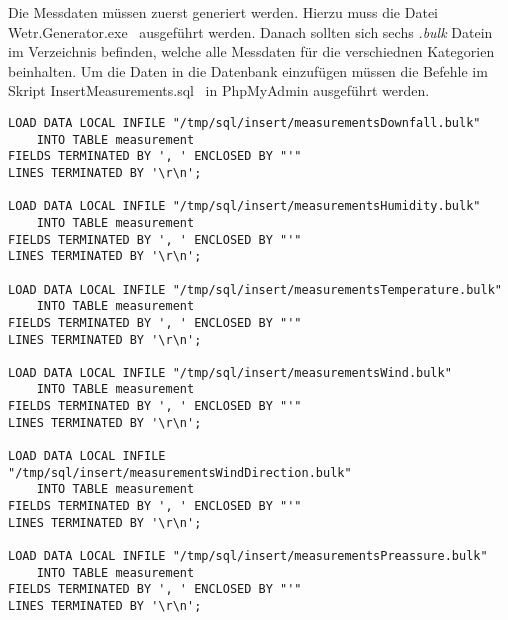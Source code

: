 Die Messdaten müssen zuerst generiert werden. Hierzu muss die Datei \glqq Wetr.Generator.exe \grqq\ ausgeführt werden. Danach sollten sich sechs \textit{.bulk} Datein im Verzeichnis befinden, welche alle Messdaten für die verschiednen Kategorien beinhalten. Um die Daten in die Datenbank einzufügen müssen die Befehle im Skript \glqq InsertMeasurements.sql \grqq\ in PhpMyAdmin ausgeführt werden.\\

\newpage
\begin{verbatim}
LOAD DATA LOCAL INFILE "/tmp/sql/insert/measurementsDownfall.bulk" 
    INTO TABLE measurement
FIELDS TERMINATED BY ', ' ENCLOSED BY "'"
LINES TERMINATED BY '\r\n';

LOAD DATA LOCAL INFILE "/tmp/sql/insert/measurementsHumidity.bulk" 
    INTO TABLE measurement
FIELDS TERMINATED BY ', ' ENCLOSED BY "'"
LINES TERMINATED BY '\r\n';

LOAD DATA LOCAL INFILE "/tmp/sql/insert/measurementsTemperature.bulk" 
    INTO TABLE measurement
FIELDS TERMINATED BY ', ' ENCLOSED BY "'"
LINES TERMINATED BY '\r\n';

LOAD DATA LOCAL INFILE "/tmp/sql/insert/measurementsWind.bulk" 
    INTO TABLE measurement
FIELDS TERMINATED BY ', ' ENCLOSED BY "'"
LINES TERMINATED BY '\r\n';

LOAD DATA LOCAL INFILE "/tmp/sql/insert/measurementsWindDirection.bulk" 
    INTO TABLE measurement
FIELDS TERMINATED BY ', ' ENCLOSED BY "'"
LINES TERMINATED BY '\r\n';

LOAD DATA LOCAL INFILE "/tmp/sql/insert/measurementsPreassure.bulk" 
    INTO TABLE measurement
FIELDS TERMINATED BY ', ' ENCLOSED BY "'"
LINES TERMINATED BY '\r\n';
\end{verbatim}